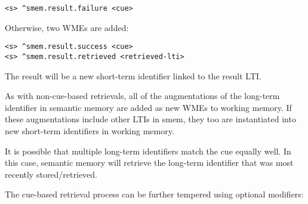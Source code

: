 \begin{verbatim}
<s> ^smem.result.failure <cue>
\end{verbatim}

Otherwise, two WMEs are added:

\begin{verbatim}
<s> ^smem.result.success <cue>
<s> ^smem.result.retrieved <retrieved-lti>
\end{verbatim}

The result  will be a new short-term identifier linked to the result LTI. 

As with non-cue-based retrievals, all of the augmentations of the long-term identifier in semantic memory are added as new WMEs to working memory. If these augmentations include other LTIs in smem, they too are instantiated into new short-term identifiers in working memory.

It is possible that multiple long-term identifiers match the cue equally well. 
In this case, semantic memory will retrieve the long-term identifier that was most recently stored/retrieved.

The cue-based retrieval process can be further tempered using optional modifiers:


